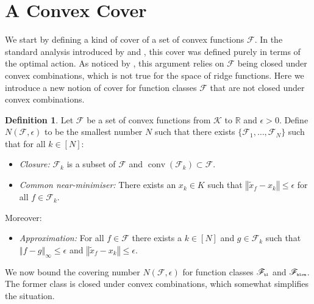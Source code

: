 \documentclass[letter, 12pt]{report}
\newcommand{\pr}{\text{\tiny\texttt{r}}}
\newcommand{\pb}{\text{\tiny\texttt{b}}}
\newcommand{\pl}{\text{\tiny\texttt{l}}}
\renewcommand{\pm}{\text{\tiny\texttt{m}}}
\newcommand{\R}{\mathbb R}
\newcommand{\norm}[1]{\left \Vert  #1 \right \Vert}
\newcommand{\cK}{\mathcal K}
\newcommand{\sF}{\mathscr F}
\newcommand{\conv}{\operatorname{conv}}
\newcommand{\1}{\mathbf{1}}
\theoremstyle{plain}
\theoremstyle{definition}
\newtheorem{definition}[theorem]{Definition}
\theoremstyle{remark}
\begin{document}
\section{A Convex Cover}\label{sec:cover}
We start by defining a kind of cover of a set of convex functions $\sF$.
In the standard analysis introduced by \cite{BDKP15} and \cite{BE18}, this cover was defined purely in terms of the optimal action.
As noticed by \cite{lattimore2021minimax}, this argument relies on $\sF$ being closed under convex combinations, which is not true
for the space of ridge functions. Here we introduce a new notion of cover for function classes $\sF$ that are not closed
under convex combinations.
\begin{definition}\label{def:cover}
    Let $\sF$ be a set of convex functions from $\cK$ to $\R$ and $\epsilon > 0$.
    Define $N(\sF, \epsilon)$ to be the smallest number $N$ such that there exists $\{\sF_1,\ldots,\sF_N\}$ such that for all $k \in [N]$:
    \begin{itemize}
        \item \textit{Closure:} $\sF_k$ is a subset of $\sF$ and $\conv(\sF_k) \subset \sF$.
        \item \textit{Common near-minimiser:} There exists an $x_k \in K$ such that $\norm{\tilde x_f - x_k} \leq \epsilon$ for all $f \in \sF_k$.
    \end{itemize}
    Moreover:
    \begin{itemize}
        \item \textit{Approximation:} For all $f \in \sF$ there exists a $k \in [N]$ and $g \in \sF_k$ such that $\norm{f - g}_\infty \leq \epsilon$
              and $\norm{\tilde x_f - x_k} \leq \epsilon$.
    \end{itemize}
\end{definition}
We now bound the covering number $N(\sF, \epsilon)$ for function classes $\sF_{\pb\pl}$ and $\sF_{\pb\pl\pr\pm}$.
The former class is closed under convex combinations, which somewhat simplifies the situation.
\end{document}
